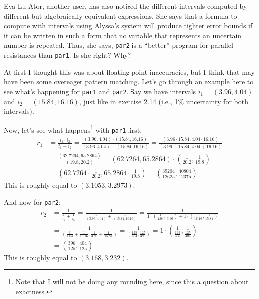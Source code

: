 \documentclass{../../sicp}
\date{June 22, 2025}
\begin{document}
\maketitle

\begin{displayquote}
	Eva Lu Ator, another user, has also noticed the different intervals computed by different but algebraically equivalent expressions. She says that a formula to compute with intervals using Alyssa’s system will produce tighter error bounds if it can be written in such a form that no variable that represents an uncertain number is repeated. Thus, she says, \texttt{par2} is a “better” program for parallel resistances than \texttt{par1}. Is she right? Why?
\end{displayquote}

At first I thought this was about floating-point inaccuracies, but I think that may have been some overeager pattern matching.
Let's go through an example here to see what's happening for \texttt{par1} and \texttt{par2}.
Say we have intervals $i_1 = (3.96, 4.04)$ and $i_2 = (15.84, 16.16)$, just like in exercise 2.14 (i.e., 1\% uncertainty for both intervals).

Now, let's see what happens\footnote{
	Note that I will not be doing any rounding here, since this a question about exactness.
} with \texttt{par1} first:
\begin{align*}
	r_1 & = \frac{i_1 \cdot i_2}{i_1 + i_2}
	= \frac{(3.96, 4.04) \cdot (15.84, 16.16)}{(3.96, 4.04) + (15.84, 16.16)}
	= \frac{(3.96 \cdot 15.84, 4.04 \cdot 16.16)}{(3.96 + 15.84, 4.04 + 16.16)}     \\
	    & = \frac{(62.7264, 65.2864)}{(19.8, 20.2)}
	= {(62.7264, 65.2864)} \cdot \left(\frac{1}{20.2}, \frac{1}{19.8}\right)        \\
	    & = \left(62.7264 \cdot \frac{1}{20.2}, 65.2864 \cdot \frac{1}{19.8}\right)
	= \left(\frac{39204}{12625}, \frac{40804}{12375}\right)
\end{align*}
This is roughly equal to $(3.1053, 3.2973)$.

And now for \texttt{par2}:
\begin{align*}
	r_2 & = \frac{1}{\frac{1}{i_1} + \frac{1}{i_2}}
	= \frac{1}{\frac{1}{(3.96, 4.04)} + \frac{1}{(15.84, 16.16)}}
	= \frac{1}{ 1 \cdot \left(\frac{1}{4.04}, \frac{1}{3.96}\right) + 1 \cdot \left(\frac{1}{16.16}, \frac{1}{15.84}\right)} \\
	    & = \frac{1}{\left(\frac{1}{4.04} + \frac{1}{16.16}, \frac{1}{3.96} + \frac{1}{15.84}\right)}
	= \frac{1}{\left(\frac{125}{404}, \frac{125}{396}\right)}
	= 1 \cdot \left(\frac{1}{\frac{125}{396}}, \frac{1}{\frac{125}{404}}\right)                                              \\
	    & = \left(\frac{396}{125}, \frac{404}{125} \right)
\end{align*}
This is roughly equal to $(3.168, 3.232)$.
\end{document}
